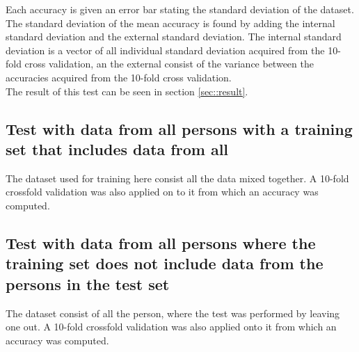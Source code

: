 Each accuracy is given an error bar stating the standard deviation of the 
dataset. The standard deviation of the mean accuracy is found by adding the 
internal standard deviation and the external standard deviation. The internal 
standard deviation is a vector of all individual standard deviation acquired 
from the 10-fold cross validation, an the external consist of the variance 
between the accuracies acquired  from the 10-fold cross validation. \\
 
The result of this test can be seen in section  \ref{sec::result}. 

\subsection{Test with data from all persons with a training set that includes 
data from all}

The dataset used for training here consist all the data mixed together. A 10-fold crossfold validation was also applied on to it from which an accuracy was computed. 



\subsection{Test with data from all persons where the training set does not 
include data from 
the persons in the test set}

The dataset consist of all the person, where the test was performed by leaving one out. A 10-fold crossfold validation was also applied onto it from which an accuracy was computed. 






